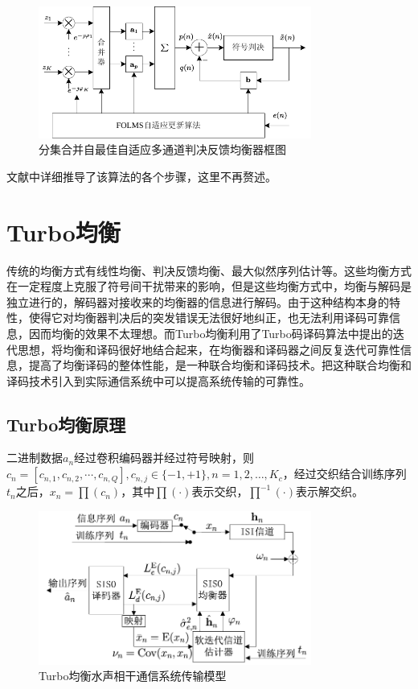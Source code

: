 \begin{figure}[htb]
  \begin{center}
    \includegraphics[width=0.8\textwidth]{images/adaptiveDFE.pdf}
  \end{center}
  \caption{分集合并自最佳自适应多通道判决反馈均衡器框图}
  \label{fig:2.3}
\end{figure}

文献中详细推导了该算法的各个步骤，这里不再赘述。
\section{Turbo均衡}
传统的均衡方式有线性均衡、判决反馈均衡、最大似然序列估计等。这些均衡方式在一定程度上克服了符号间干扰带来的影响，但是这些均衡方式中，均衡与解码是独立进行的，解码器对接收来的均衡器的信息进行解码。由于这种结构本身的特性，使得它对均衡器判决后的突发错误无法很好地纠正，也无法利用译码可靠信息，因而均衡的效果不太理想。而Turbo均衡利用了Turbo码译码算法中提出的迭代思想，将均衡和译码很好地结合起来，在均衡器和译码器之间反复迭代可靠性信息，提高了均衡译码的整体性能，是一种联合均衡和译码技术。把这种联合均衡和译码技术引入到实际通信系统中可以提高系统传输的可靠性。
\subsection{Turbo均衡原理}
二进制数据$a_n$经过卷积编码器并经过符号映射，则$c_n=[c_{n,1},c_{n,2},\cdots,c_{n,Q}],c_{n,j}\in\{-1,+1\},n=1,2,\ldots,K_c$，经过交织结合训练序列$t_n$之后，$x_n=\prod(c_n)$，其中$\prod(\cdot)$表示交织，$\prod^{-1}(\cdot)$表示解交织。

\begin{figure}[htb]
  \begin{center}
    \includegraphics[width=0.8\textwidth]{images/totalcomm2.pdf}
  \end{center}
  \caption{Turbo均衡水声相干通信系统传输模型}
  \label{fig:2.4}
\end{figure}

